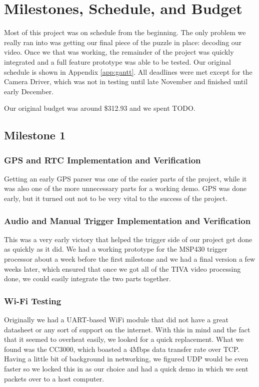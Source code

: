 \documentclass[12pt]{article}
\begin{document}
\section{Milestones, Schedule, and Budget}
Most of this project was on schedule from the beginning. The only problem we
really ran into was getting our final piece of the puzzle in place: decoding
our video. Once we that was working, the remainder of the project was quickly
integrated and a full feature prototype was able to be tested. Our original
schedule is shown in Appendix \ref{app:gantt}. All deadlines were met except
for the Camera Driver, which was not in testing until late November and
finished until early December.

Our original budget was around \$312.93 and we spent TODO. %

\subsection{Milestone 1}
\subsubsection{GPS and RTC Implementation and Verification}
Getting an early GPS parser was one of the easier parts of the project, while
it was also one of the more unnecessary parts for a working demo. GPS was done
early, but it turned out not to be very vital to the success of the project.

\subsubsection{Audio and Manual Trigger Implementation and Verification}
This was a very early victory that helped the trigger side of our project get
done as quickly as it did. We had a working prototype for the MSP430 trigger
processor about a week before the first milestone and we had a final version a
few weeks later, which ensured that once we got all of the TIVA video
processing done, we could easily integrate the two parts together.

\subsubsection{Wi-Fi Testing}
Originally we had a UART-based WiFi module that did not have a great datasheet
or any sort of support on the internet. With this in mind and the fact that it
seemed to overheat easily, we looked for a quick replacement. What we found was
the CC3000, which boasted a 4Mbps data transfer rate over TCP. Having a little
bit of background in networking, we figured UDP would be even faster so we
locked this in as our choice and had a quick demo in which we sent packets over
to a host computer.
\end{document}
